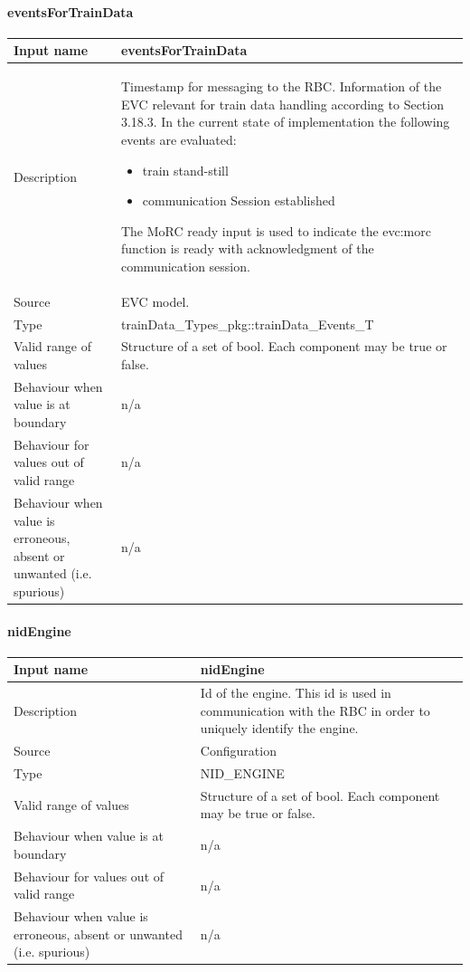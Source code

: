 \paragraph{eventsForTrainData}

\begin{longtable}{p{}p{}}
\toprule
Input name				& eventsForTrainData\\
\midrule
Description				& Timestamp for messaging to the RBC. Information of the EVC relevant for train data handling according to Section 3.18.3. In the current state of implementation the following events are evaluated:
\begin{itemize}
\item train stand-still
\item communication Session established
\end{itemize}
The MoRC ready input is used to indicate the evc:morc function is ready with acknowledgment of the communication session.\\
\midrule
Source					& EVC model.\\ 
\midrule
Type					& trainData\_Types\_pkg::trainData\_Events\_T\\
\midrule
Valid range of values	& Structure of a set of bool. Each component may be true or false.\\
\midrule
Behaviour when value is at boundary	& n/a\\
\midrule
Behaviour for values out of valid range	& n/a\\
\midrule
Behaviour when value is erroneous, absent or unwanted (i.e. spurious) & n/a\\

\bottomrule
\end{longtable}

\paragraph{nidEngine}

\begin{longtable}{p{}p{}}
\toprule
Input name				& nidEngine\\
\midrule
Description				& Id of the engine. This id is used in communication with the RBC in order to uniquely identify the engine.\\
\midrule
Source					& Configuration\\ 
\midrule
Type					& NID\_ENGINE\\
\midrule
Valid range of values	& Structure of a set of bool. Each component may be true or false.\\
\midrule
Behaviour when value is at boundary	& n/a\\
\midrule
Behaviour for values out of valid range	& n/a\\
\midrule
Behaviour when value is erroneous, absent or unwanted (i.e. spurious) & n/a\\

\bottomrule
\end{longtable}
